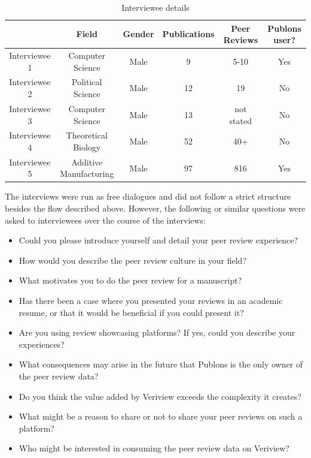 \begin{table}[]
    \centering
    \begin{tabular}{c|c|c|c|c|c}
         & Field & Gender & Publications & Peer Reviews & Publons user? \\
         \hline
         Interviewee 1 & Computer Science & Male & 9 & 5-10 & Yes \\
         Interviewee 2 & Political Science & Male & 12 & 19 & No \\
         Interviewee 3 & Computer Science & Male & 13 & not stated & No \\
         Interviewee 4 & Theoretical Biology & Male & 52 & 40+ & No \\
         Interviewee 5 & Additive Manufacturing & Male & 97 & 816 & Yes \\
    \end{tabular}
    \caption{Interviewee details}
    \label{tab:interviewees}
\end{table}

The interviews were run as free dialogues and did not follow a strict structure besides the flow described above. However, the following or similar questions were asked to interviewees over the course of the interviews:

\begin{itemize}
    \item Could you please introduce yourself and detail your peer review experience?
    \item How would you describe the peer review culture in your field?
    \item What motivates you to do the peer review for a manuscript?
    \item Has there been a case where you presented your reviews in an academic resume, or that it would be beneficial if you could present it?
    \item Are you using review showcasing platforms? If yes, could you describe your experiences?
    \item What consequences may arise in the future that Publons is the only owner of the peer review data?
    \item Do you think the value added by Veriview exceeds the complexity it creates?
    \item What might be a reason to share or not to share your peer reviews on such a platform?
    \item Who might be interested in consuming the peer review data on Veriview?
\end{itemize}

